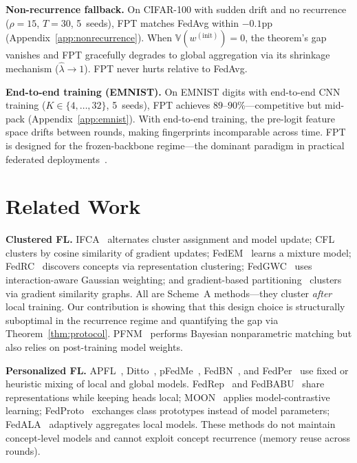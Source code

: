\documentclass[11pt]{article}
\newcommand{\V}{\mathbb{V}}
\begin{document}
\textbf{Non-recurrence fallback.}
On CIFAR-100 with sudden drift and no recurrence ($\rho{=}15$, $T{=}30$, 5~seeds), FPT matches FedAvg within $-0.1$pp (Appendix~\ref{app:nonrecurrence}).
When $\V(w^{(\mathrm{init})}) = 0$, the theorem's gap vanishes and FPT gracefully degrades to global aggregation via its shrinkage mechanism ($\hat\lambda \to 1$).
FPT never hurts relative to FedAvg.

\textbf{End-to-end training (EMNIST).}
On EMNIST digits with end-to-end CNN training ($K \in \{4,\ldots,32\}$, 5~seeds), FPT achieves $89$--$90\%$---competitive but mid-pack (Appendix~\ref{app:emnist}).
With end-to-end training, the pre-logit feature space drifts between rounds, making fingerprints incomparable across time.
FPT is designed for the frozen-backbone regime---the dominant paradigm in practical federated deployments~\citep{mcmahan2017communication, chen2022on}.


\section{Related Work}
\label{sec:related}

\textbf{Clustered FL.}
IFCA~\citep{ghosh2020efficient} alternates cluster assignment and model update; CFL~\citep{sattler2021clustered} clusters by cosine similarity of gradient updates; FedEM~\citep{marfoq2021federated} learns a mixture model; FedRC~\citep{guo2024fedrc} discovers concepts via representation clustering; FedGWC~\citep{licciardi2025fedgwc} uses interaction-aware Gaussian weighting; and gradient-based partitioning~\citep{kim2024gradient} clusters via gradient similarity graphs.
All are Scheme~A methods---they cluster \emph{after} local training.
Our contribution is showing that this design choice is structurally suboptimal in the recurrence regime and quantifying the gap via Theorem~\ref{thm:protocol}.
PFNM~\citep{yurochkin2019bayesian} performs Bayesian nonparametric matching but also relies on post-training model weights.

\textbf{Personalized FL.}
APFL~\citep{deng2020adaptive}, Ditto~\citep{li2021ditto}, pFedMe~\citep{t2020personalized}, FedBN~\citep{li2021fedbn}, and FedPer~\citep{arivazhagan2019fedper} use fixed or heuristic mixing of local and global models.
FedRep~\citep{collins2021exploiting} and FedBABU~\citep{oh2022fedbabu} share representations while keeping heads local; MOON~\citep{li2021model} applies model-contrastive learning; FedProto~\citep{tan2022fedproto} exchanges class prototypes instead of model parameters; FedALA~\citep{zhang2023fedala} adaptively aggregates local models.
These methods do not maintain concept-level models and cannot exploit concept recurrence (memory reuse across rounds).
\end{document}
